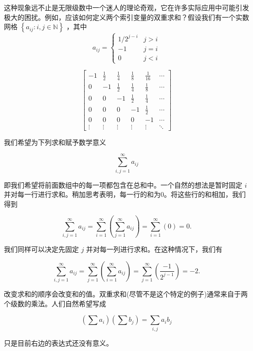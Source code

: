 这种现象远不止是无限级数中一个迷人的理论奇观，它在许多实际应用中可能引发极大的困扰。例如，应该如何定义两个索引变量的双重求和？假设我们有一个实数网格 \(\left\{  {{a}_{ij} : i,j \in  \mathbb{N}}\right\}\) ，其中
$$
a_{ij} =
\begin{cases}
  1/{2}^{j - i} & j> i \\ -1 & j=i \\ 0 & j<i
\end{cases}
$$


\[
\left\lbrack  \begin{matrix}  - 1 & \frac{1}{2} & \frac{1}{4} & \frac{1}{8} & \frac{1}{16} & \cdots \\  0 &  - 1 & \frac{1}{2} & \frac{1}{4} & \frac{1}{8} & \cdots \\  0 & 0 &  - 1 & \frac{1}{2} & \frac{1}{4} & \cdots \\  0 & 0 & 0 &  - 1 & \frac{1}{2} & \cdots \\  0 & 0 & 0 & 0 &  - 1 & \cdots \\  \vdots & \vdots & \vdots & \vdots & \vdots &  \ddots   \end{matrix}\right\rbrack
\]

我们希望为下列求和赋予数学意义

\[
\mathop{\sum }\limits_{{i,j = 1}}^{\infty }{a}_{ij}
\]

即我们希望将前面数组中的每一项都包含在总和中。一个自然的想法是暂时固定 \(i\) 并对每一行进行求和。稍加思考表明，每一行的和为$0$。将这些行的和相加，我们得到

\[
\mathop{\sum }\limits_{{i,j = 1}}^{\infty }{a}_{ij} = \mathop{\sum }\limits_{{i = 1}}^{\infty }\left( {\mathop{\sum }\limits_{{j = 1}}^{\infty }{a}_{ij}}\right)  = \mathop{\sum }\limits_{{i = 1}}^{\infty }\left( 0\right)  = 0.
\]

我们同样可以决定先固定 \(j\) 并对每一列进行求和。在这种情况下，我们有

\[
\mathop{\sum }\limits_{{i,j = 1}}^{\infty }{a}_{ij} = \mathop{\sum }\limits_{{j = 1}}^{\infty }\left( {\mathop{\sum }\limits_{{i = 1}}^{\infty }{a}_{ij}}\right)  = \mathop{\sum }\limits_{{j = 1}}^{\infty }\left( \frac{-1}{{2}^{j - 1}}\right)  =  - 2.
\]

改变求和的顺序会改变和的值。双重求和(尽管不是这个特定的例子)通常来自于两个级数的乘法。人们自然希望写成

\[
\left( {\sum {a}_{i}}\right) \left( {\sum {b}_{j}}\right)  = \mathop{\sum }\limits_{{i,j}}{a}_{i}{b}_{j}
\]

只是目前右边的表达式还没有意义。


